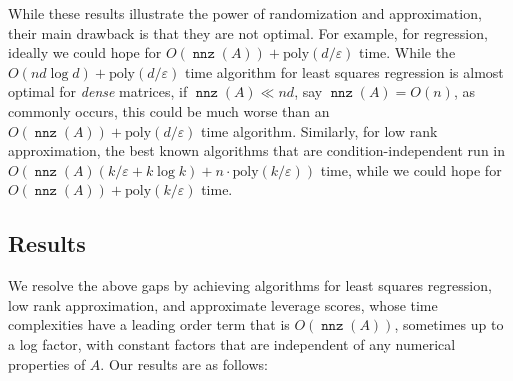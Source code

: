 \documentclass{sig-alternate}
\DeclareMathOperator{\nnz}{\mathtt{nnz}}
\newcommand{\poly}{{\mathrm{poly}}}
\newcommand{\eps}{\varepsilon}
\begin{document}
While these results illustrate the power of randomization and approximation, their main drawback
is that they are not optimal. For example, for regression, ideally we could hope for $O(\nnz(A)) + \poly(d/\eps)$
time. While the $O(nd \log d) + \poly(d/\eps)$ time algorithm for least squares regression
is almost optimal for {\it dense} matrices, if $\nnz(A)\ll nd$, say $\nnz(A)=O(n)$, as commonly
occurs, this could be much worse than an $O(\nnz(A)) + \poly(d/\eps)$ time algorithm.
Similarly, for low rank approximation, the best known algorithms that are condition-independent run in 
$O(\nnz(A) (k/\eps + k \log k) + n \cdot \poly(k/\eps))$ time, while we could hope
for $O(\nnz(A)) + \poly(k/\eps)$ time. 

\subsection{Results}
We resolve the above gaps by achieving algorithms
for least squares regression, low rank approximation,
and approximate leverage scores, whose time complexities have 
a leading order term that is
$O(\nnz(A))$, sometimes up to a log factor,
with constant factors that are independent of any numerical properties of $A$.
Our results are as follows:
\end{document}
